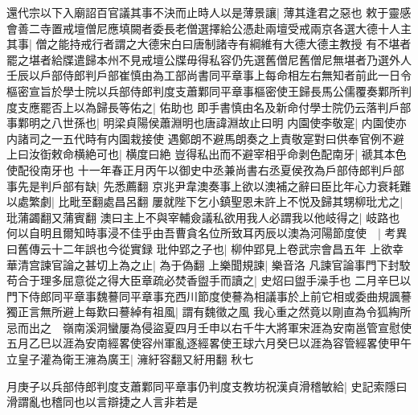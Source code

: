 還代宗以下入廟詔百官議其事不決而止時人以是薄景讓|{
	薄其逢君之惡也}
敕于靈感會善二寺置戒壇僧尼應填闕者委長老僧選擇給公憑赴兩壇受戒兩京各選大德十人主其事|{
	僧之能持戒行者謂之大德宋白曰唐制諸寺有綱維有大德大德主教授}
有不堪者罷之堪者給牒遣歸本州不見戒壇公牒毋得私容仍先選舊僧尼舊僧尼無堪者乃選外人　壬辰以戶部侍郎判戶部崔慎由為工部尚書同平章事上每命相左右無知者前此一日令樞密宣旨於學士院以兵部侍郎判度支蕭鄴同平章事樞密使王歸長馬公儒覆奏鄴所判度支應罷否上以為歸長等佑之|{
	佑助也}
即手書慎由名及新命付學士院仍云落判戶部事鄴明之八世孫也|{
	明梁貞陽侯蕭淵明也唐諱淵故止曰明}
内園使李敬寔|{
	内園使亦内諸司之一五代時有内園栽接使}
遇鄭朗不避馬朗奏之上責敬寔對曰供奉官例不避上曰汝衘敕命横絶可也|{
	横度曰絶}
豈得私出而不避宰相乎命剥色配南牙|{
	禠其本色使配役南牙也}
十一年春正月丙午以御史中丞兼尚書右丞夏侯孜為戶部侍郎判戶部事先是判戶部有缺|{
	先悉薦翻}
京兆尹韋澳奏事上欲以澳補之辭曰臣比年心力衰耗難以處繁劇|{
	比毗至翻處昌呂翻}
屢就陛下乞小鎮聖恩未許上不悦及歸其甥柳玭尤之|{
	玭蒲蠲翻又蒲賓翻}
澳曰主上不與宰輔僉議私欲用我人必謂我以他岐得之|{
	岐路也}
何以自明且爾知時事浸不佳乎由吾曹貪名位所致耳丙辰以澳為河陽節度使　|{
	考異曰舊傳云十二年誤也今從實録}
玭仲郢之子也|{
	柳仲郢見上卷武宗會昌五年}
上欲幸華清宫諫官論之甚切上為之止|{
	為于偽翻}
上樂聞規諫|{
	樂音洛}
凡諫官論事門下封駮苟合于理多屈意從之得大臣章疏必焚香盥手而讀之|{
	史炤曰盥手澡手也}
二月辛巳以門下侍郎同平章事魏謩同平章事充西川節度使謩為相議事於上前它相或委曲規諷謩獨正言無所避上每歎曰謩綽有祖風|{
	謂有魏徵之風}
我心重之然竟以剛直為令狐綯所忌而出之　嶺南溪洞蠻屢為侵盜夏四月壬申以右千牛大將軍宋涯為安南邕管宣慰使五月乙巳以涯為安南經畧使容州軍亂逐經畧使王球六月癸巳以涯為容管經畧使甲午立皇子灌為衛王澭為廣王|{
	澭紆容翻又紆用翻}
秋七

月庚子以兵部侍郎判度支蕭鄴同平章事仍判度支教坊祝漢貞滑稽敏給|{
	史記索隱曰滑謂亂也稽同也以言辯捷之人言非若是}


